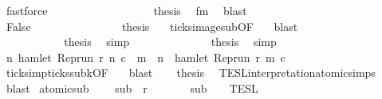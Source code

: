 \begin{isabellebody}
\ fastforce\isanewline
\ \ \ \ \ \ \ \ \ \ \ \ \ \ \isamarkupfalse%
\ {}\ \isamarkupfalse%
\ {\isacharquery}thesis\ \isamarkupfalse%
\ fm{}\ \isamarkupfalse%
\ blast\isanewline
\ \ \ \ \ \ \ \ \ \ \isamarkupfalse%
\isanewline
\ \ \ \ \ \ \ \ \ \ \ \ \isamarkupfalse%
\ False\isanewline
\ \ \ \ \ \ \ \ \ \ \ \ \ \ \isamarkupfalse%
\ {\isacharquery}thesis\ \ \isamarkupfalse%
\ ticks{\isacharunderscore}image{\isacharunderscore}sub{\isacharprime}{\isacharbrackleft}OF\ {\isacharasterisk}{\isacharbrackright}\ \isamarkupfalse%
\ blast\isanewline
\ \ \ \ \ \ \ \ \ \ \isamarkupfalse%
\isanewline
\ \ \ \ \ \ \ \ \isacommand{{\isacharbraceright}}\isamarkupfalse%
\ \isamarkupfalse%
\ {\isacharquery}thesis\ \isamarkupfalse%
\ simp\isanewline
\ \ \ \ \ \ \isamarkupfalse%
\isanewline
\ \ \ \ \isacommand{{\isacharbraceright}}\isamarkupfalse%
\ \isamarkupfalse%
\ {\isacharquery}thesis\ \isamarkupfalse%
\ simp\isanewline
\ \ \isamarkupfalse%
\isanewline
\ \ \isamarkupfalse%
\ {\isacartoucheopen}{\isasymforall}n{\isachardot}\ hamlet\ {\isacharparenleft}Rep{\isacharunderscore}run\ r\ n\ c\ {\isasymlongrightarrow}\ {\isacharparenleft}{\isasymforall}m\ {\isasymge}\ n{\isachardot}\ {\isasymnot}\ hamlet\ {\isacharparenleft}Rep{\isacharunderscore}run\ r\ m\ c\isanewline
\ \ \ \ \isamarkupfalse%
\ ticks{\isacharunderscore}imp{\isacharunderscore}ticks{\isacharunderscore}subk{\isacharbrackleft}OF\ {\isacharasterisk}{\isacharbrackright}\ \isamarkupfalse%
\ blast\isanewline
\ \ \isamarkupfalse%
\ {\isacharquery}thesis\ \isamarkupfalse%
\ TESL{\isacharunderscore}interpretation{\isacharunderscore}atomic{\isachardot}simps{\isacharparenleft}{}{\isacharparenright}\ \isamarkupfalse%
\ blast\isanewline
{}\isamarkupfalse%
%
\endisatagproof
{\isafoldproof}%
%
\isadelimproof
\isanewline
%
\endisadelimproof
\isanewline
{}\isamarkupfalse%
\ atomic{\isacharunderscore}sub{\isacharcolon}\ \isanewline
\ \ \ {\isacartoucheopen}sub\ {\isasymlless}\ r{\isacartoucheclose}\isanewline
\ \ \ \ \ \ \ {\isacartoucheopen}sub\ {\isasymin}\ {\isasymlbrakk}\ {\isasymphi}\ {\isasymrbrakk}\isactrlsub T\isactrlsub E\isactrlsub S\isactrlsub L{\isacartoucheclose}\isanewline

\end{isabellebody}
